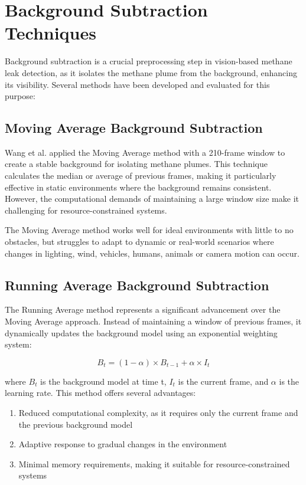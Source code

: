 \section{Background Subtraction Techniques}

Background subtraction is a crucial preprocessing step in vision-based methane leak detection, as it isolates the methane plume from the background, enhancing its visibility. Several methods have been developed and evaluated for this purpose:

\subsection{Moving Average Background Subtraction}

Wang et al. applied the Moving Average method with a 210-frame window to create a stable background for isolating methane plumes. This technique calculates the median or average of previous frames, making it particularly effective in static environments where the background remains consistent. However, the computational demands of maintaining a large window size make it challenging for resource-constrained systems.

The Moving Average method works well for ideal environments with little to no obstacles, but struggles to adapt to dynamic or real-world scenarios where changes in lighting, wind, vehicles, humans, animals or camera motion can occur.

\subsection{Running Average Background Subtraction}

The Running Average method represents a significant advancement over the Moving Average approach. Instead of maintaining a window of previous frames, it dynamically updates the background model using an exponential weighting system:

\begin{equation}
B_t = (1 - \alpha) \times B_{t-1} + \alpha \times I_t
\end{equation}

where $B_t$ is the background model at time t, $I_t$ is the current frame, and $\alpha$ is the learning rate. This method offers several advantages:

\begin{enumerate}
\item Reduced computational complexity, as it requires only the current frame and the previous background model
\item Adaptive response to gradual changes in the environment  
\item Minimal memory requirements, making it suitable for resource-constrained systems
\end{enumerate}

